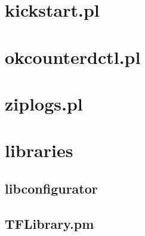 \documentclass[11pt,a4paper,openany,oneside]{book}
\begin{document}
\section{kickstart.pl}





\section{okcounterdctl.pl}

\section{ziplogs.pl}



\section{libraries}

\subsection{libconfigurator}



\subsection{TFLibrary.pm}
\end{document}
